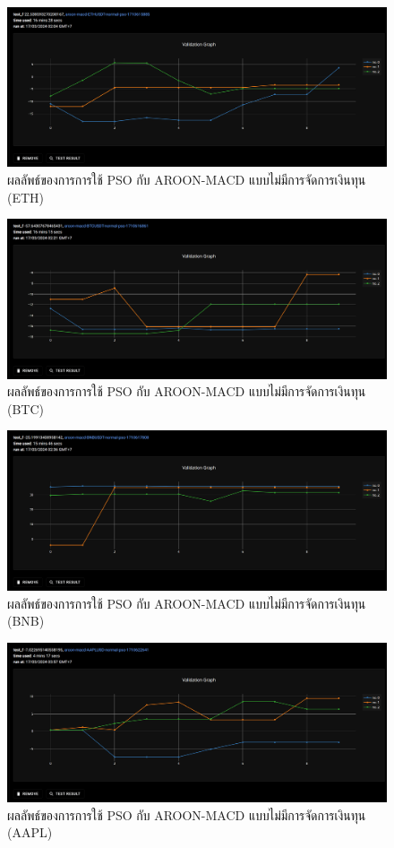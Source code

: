 \begin{figure}[ht]
    \centering
    \includegraphics[width=\textwidth]{images/pso/aroon-macd/eth-normal.png}
    \caption{ผลลัพธ์ของการการใช้ PSO กับ AROON-MACD แบบไม่มีการจัดการเงินทุน (ETH)}
\end{figure}
\begin{figure}[ht]
    \centering
    \includegraphics[width=\textwidth]{images/pso/aroon-macd/btc-normal.png}
    \caption{ผลลัพธ์ของการการใช้ PSO กับ AROON-MACD แบบไม่มีการจัดการเงินทุน (BTC)}
\end{figure}
\begin{figure}[ht]
    \centering
    \includegraphics[width=\textwidth]{images/pso/aroon-macd/bnb-normal.png}
    \caption{ผลลัพธ์ของการการใช้ PSO กับ AROON-MACD แบบไม่มีการจัดการเงินทุน (BNB)}
\end{figure}
\begin{figure}[ht]
    \centering
    \includegraphics[width=\textwidth]{images/pso/aroon-macd/aapl-normal.png}
    \caption{ผลลัพธ์ของการการใช้ PSO กับ AROON-MACD แบบไม่มีการจัดการเงินทุน (AAPL)}
\end{figure}
